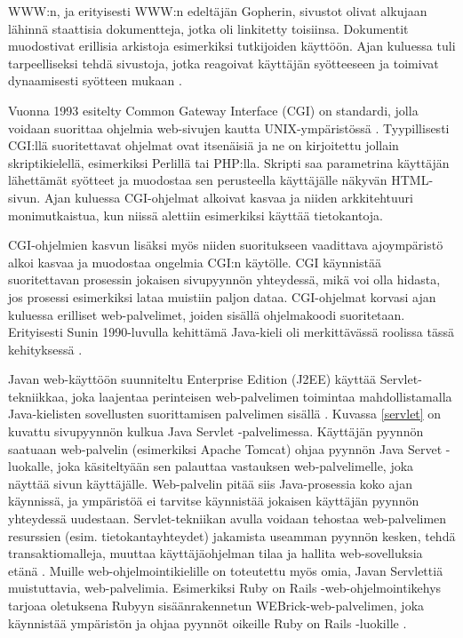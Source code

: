 WWW:n, ja erityisesti WWW:n edeltäjän Gopherin, sivustot olivat alkujaan lähinnä staattisia dokumentteja, jotka oli linkitetty toisiinsa. Dokumentit muodostivat erillisia arkistoja esimerkiksi tutkijoiden käyttöön. Ajan kuluessa tuli tarpeelliseksi tehdä sivustoja, jotka reagoivat käyttäjän syötteeseen ja toimivat dynaamisesti syötteen mukaan \cite{dynamic}.

Vuonna 1993 esitelty Common Gateway Interface (CGI) on standardi, jolla voidaan suorittaa ohjelmia web-sivujen kautta UNIX-ympäristössä \cite{rfc3875}. Tyypillisesti CGI:llä suoritettavat ohjelmat ovat itsenäisiä ja ne on kirjoitettu jollain skriptikielellä, esimerkiksi Perlillä tai PHP:lla. Skripti saa parametrina käyttäjän lähettämät syötteet ja muodostaa sen perusteella käyttäjälle näkyvän HTML-sivun. Ajan kuluessa CGI-ohjelmat alkoivat kasvaa ja niiden arkkitehtuuri monimutkaistua, kun niissä alettiin esimerkiksi käyttää tietokantoja.

CGI-ohjelmien kasvun lisäksi myös niiden suoritukseen vaadittava ajoympäristö alkoi kasvaa ja muodostaa ongelmia CGI:n käytölle. CGI käynnistää suoritettavan prosessin jokaisen sivupyynnön yhteydessä, mikä voi olla hidasta, jos prosessi esimerkiksi lataa muistiin paljon dataa. CGI-ohjelmat korvasi ajan kuluessa erilliset web-palvelimet, joiden sisällä ohjelmakoodi suoritetaan. Erityisesti Sunin 1990-luvulla kehittämä Java-kieli oli merkittävässä roolissa tässä kehityksessä \cite{uml}.

Javan web-käyttöön suunniteltu Enterprise Edition (J2EE) käyttää Serv\-let-tek\-niik\-kaa, joka laajentaa perinteisen web-palvelimen toimintaa mahdollistamalla Java-kielisten sovellusten suorittamisen palvelimen sisällä \cite{j2ee} . Kuvassa \ref{servlet} on kuvattu sivupyynnön kulkua Java Servlet -palvelimessa. Käyttäjän pyynnön saatuaan web-palvelin (esimerkiksi Apache Tomcat) ohjaa pyynnön Java Servet -luokalle, joka käsiteltyään sen palauttaa vastauksen web-palvelimelle, joka näyttää sivun käyttäjälle. Web-palvelin pitää siis Java-prosessia koko ajan käynnissä, ja ympäristöä ei tarvitse käynnistää jokaisen käyttäjän pyynnön yhteydessä uudestaan. Servlet-tekniikan avulla voidaan tehostaa web-palvelimen resurssien (esim. tietokantayhteydet) jakamista useamman pyynnön kesken, tehdä transaktiomalleja, muuttaa käyttäjäohjelman tilaa ja hallita web-sovelluksia etänä \cite{uml}. Muille web-ohjelmointikielille on toteutettu myös omia, Javan Servlettiä muistuttavia, web-palvelimia. Esimerkiksi Ruby on Rails -web-ohjelmointikehys tarjoaa oletuksena Rubyyn sisäänrakennetun WEBrick-web-palvelimen, joka käynnistää ympäristön ja ohjaa pyynnöt oikeille Ruby on Rails -luokille \cite{ruby2011agile}.

